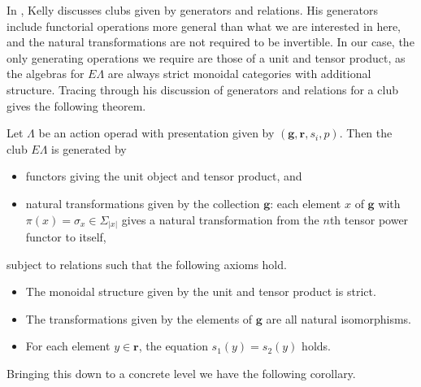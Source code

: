 In \cite{kelly_club1}, Kelly discusses clubs given by generators and relations. His generators include functorial operations more general than what we are interested in here, and the natural transformations are not required to be invertible. In our case, the only generating operations we require are those of a unit and tensor product, as the algebras for $E\Lambda$ are always strict monoidal categories with additional structure. Tracing through his discussion of generators and relations for a club gives the following theorem.

\begin{thm}\label{pres1}
Let $\Lambda$ be an action operad with presentation given by $(\mathbf{g},\mathbf{r}, s_{i}, p)$. Then the club $E\Lambda$ is generated by
\begin{itemize}
  \item functors giving the unit object and tensor product, and
  \item natural transformations given by the collection $\mathbf{g}$:  each element $x$ of $\mathbf{g}$ with $\pi(x) = \sigma_{x} \in \Sigma_{|x|}$ gives a natural transformation from the $n$th tensor power functor to itself,
\end{itemize}
subject to relations such that the following axioms hold.
\begin{itemize}
  \item The monoidal structure given by the unit and tensor product is strict.
  \item The transformations given by the elements of $\mathbf{g}$ are all natural isomorphisms.
  \item For each element $y \in \mathbf{r}$, the equation $s_{1}(y) = s_{2}(y)$ holds.
\end{itemize}
\end{thm}

Bringing this down to a concrete level we have the following corollary.

